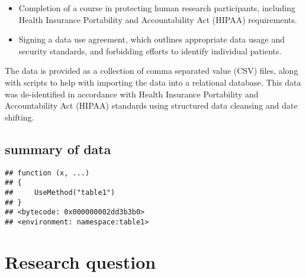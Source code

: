 \documentclass[]{interact}
\theoremstyle{plain}%
\theoremstyle{definition}
\theoremstyle{remark}
\def\tightlist{}
\begin{document}
\begin{itemize}
\tightlist
\item
  Completion of a course in protecting human research participants,
  including Health Insurance Portability and Accountability Act (HIPAA)
  requirements.
\item
  Signing a data use agreement, which outlines appropriate data usage
  and security standards, and forbidding efforts to identify individual
  patients.
\end{itemize}

The data is provided as a collection of comma separated value (CSV)
files, along with scripts to help with importing the data into a
relational database. This data was de-identified in accordance with
Health Insurance Portability and Accountability Act (HIPAA) standards
using structured data cleansing and date shifting.\citep{JGoldberger}

\hypertarget{summary-of-data}{%
\subsection{summary of data}\label{summary-of-data}}

\begin{verbatim}
## function (x, ...) 
## {
##     UseMethod("table1")
## }
## <bytecode: 0x000000002dd3b3b0>
## <environment: namespace:table1>
\end{verbatim}

\hypertarget{research-question}{%
\section{Research question}\label{research-question}}



\end{document}
